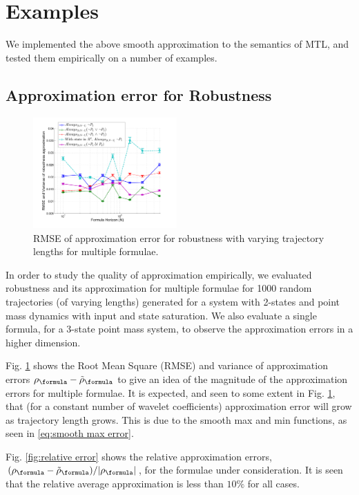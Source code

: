 \section{Examples}
\label{sec:examples}
We implemented the above smooth approximation to the semantics of MTL, and tested them empirically on a number of examples.

\subsection{Approximation error for Robustness}
\label{sec: ex apx error}
\begin{figure}[t]
\centering
\includegraphics[width=0.49\textwidth]{figures/RobustnessError}
\caption{RMSE of approximation error for robustness with varying trajectory lengths for multiple formulae.}
\label{fig:sample result}
\end{figure}

In order to study the quality of approximation empirically, we evaluated robustness and its approximation for multiple formulae for 1000 random trajectories (of varying lengths) generated for a system with 2-states and point mass dynamics with input and state saturation. We also evaluate a single formula, for a 3-state point mass system, to observe the approximation errors in a higher dimension.

Fig. \ref{fig:sample result} shows the Root Mean Square (RMSE) and variance of approximation errors $\robf-\srobf$ to give an idea of the magnitude of the approximation errors for multiple formulae. 
It is expected, and seen to some extent in Fig. \ref{fig:sample result}, that (for a constant number of wavelet coefficients) approximation error will grow as trajectory length grows. This is due to the smooth max and min functions, as seen in \eqref{eq:smooth max error}.

Fig. \ref{fig:relative error} shows the relative approximation errors, $(\robf-\srobf)/|\robf|$, for the formulae under consideration. It is seen that the relative average approximation is less than $10\%$ for all cases. 

